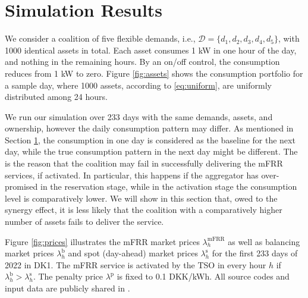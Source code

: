 \documentclass[conference]{IEEEtran}
\begin{document}
\section{Simulation Results}\label{chapter3}
%


We consider a coalition of five flexible demands, i.e., $\mathcal{D}=\{d_1, d_2, d_3, d_4, d_5\}$, with 1000 identical assets in total. Each asset consumes 1 kW in one hour of the day, and nothing in the remaining hours. By an on/off control, the consumption reduces from 1 kW to zero. Figure \ref{fig:assets} shows the consumption portfolio for a sample day, where 1000 assets, according to \eqref{eq:uniform}, are uniformly distributed among 24 hours. 

We run our simulation over 233 days with the same demands, assets, and ownership, however the daily consumption pattern may differ. As mentioned in Section \ref{chapter3}, the consumption in one day is considered as the baseline for the next day, while the true consumption pattern in the next day might be different. The is the reason that the coalition may fail in successfully delivering the mFRR services, if activated. In particular, this happens if the aggregator has over-promised in the reservation stage, while in the activation stage the consumption level is comparatively lower. We will show in this section that, owed to the synergy effect, it is less likely that the coalition with a comparatively higher number of assets fails to deliver the service.   

Figure \ref{fig:prices} illustrates the mFRR market prices $\lambda^{\text{mFRR}}_h$ as well as balancing market prices $\lambda^{\text{b}}_h$ and spot (day-ahead) market prices $\lambda^{\text{s}}_h$ for the first 233 days of 2022 in DK1. The mFRR service is activated by the TSO in every hour $h$ if $\lambda^{\text{b}}_h > \lambda^{\text{s}}_h$. 
The penalty price $\lambda^{\text{p}}$ is fixed to 0.1 DKK/kWh. All source codes and input data are
publicly shared in \cite{code}.
\end{document}

